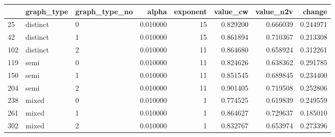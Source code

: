 \begin{tabular}{lllrrrrr}
\toprule
 & graph_type & graph_type_no & alpha & exponent & value_cw & value_n2v & change \\
\midrule
25 & distinct & 0 & 0.010000 & 15 & 0.829200 & 0.666039 & 0.244971 \\
42 & distinct & 1 & 0.010000 & 15 & 0.861894 & 0.710367 & 0.213308 \\
102 & distinct & 2 & 0.010000 & 11 & 0.864680 & 0.658924 & 0.312261 \\
119 & semi & 0 & 0.010000 & 11 & 0.824626 & 0.638362 & 0.291785 \\
150 & semi & 1 & 0.010000 & 11 & 0.851545 & 0.689845 & 0.234400 \\
204 & semi & 2 & 0.010000 & 11 & 0.901405 & 0.719508 & 0.252806 \\
238 & mixed & 0 & 0.010000 & 1 & 0.774525 & 0.619839 & 0.249559 \\
261 & mixed & 1 & 0.010000 & 1 & 0.864627 & 0.729637 & 0.185010 \\
302 & mixed & 2 & 0.010000 & 1 & 0.832767 & 0.653974 & 0.273396 \\
\bottomrule
\end{tabular}
